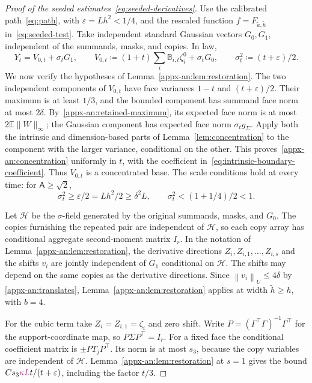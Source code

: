 \documentclass[11pt,letterpaper]{article}
\newcommand{\vSix}[1]{{\color{magenta}#1}}
\theoremstyle{remark}
\newcommand{\E}{\mathbb E}
\newcommand{\norm}[1]{\left\lVert#1\right\rVert}
\begin{document}
\begin{proof}[Proof of the seeded estimates~\eqref{eq:seeded-derivatives}]
Use the calibrated path~\eqref{eq:path}, with
\(\varepsilon=Lh^2<1/4\), and the rescaled function
\(f=F_{\widetilde a,\widetilde h}\) in~\eqref{eq:seeded-test}.
Take independent standard Gaussian vectors \(G_0,G_1\), independent
of the summands, masks, and copies. In law,
\begin{equation}
 Y_t=V_{0,t}+\sigma_tG_1,\qquad
 V_{0,t}\coloneqq(1+t)\sum_i\mathbb B_{i,t}\zeta_i^0+\sigma_tG_0,
 \qquad\sigma_t^2\coloneqq(t+\varepsilon)/2.
 \label{eq:seeded-gaussian-split}
\end{equation}
{We now verify the hypotheses of Lemma~\ref{appx-an:lem:restoration}.}
The two independent components of \(V_{0,t}\) have face variances
\(1-t\) and \((t+\varepsilon)/2\). Their maximum is at least
\(1/3\), and the bounded component has summand face norm at most
\vSix{\(2\delta\). By~\eqref{appx-an:retained-maximum}, its expected
face norm is at most \(2\E\|W\|_\infty\); the Gaussian component
has expected face norm \(\sigma_tg_\Sigma\). Apply both the intrinsic
and dimension-based parts of Lemma~\ref{lem:concentration} to the
component with the larger variance, conditional on the other. This
proves~\eqref{appx-an:concentration} uniformly in \(t\), with the
coefficient in~\eqref{eq:intrinsic-boundary-coefficient}.}
Thus \(V_{0,t}\) is a concentrated base. The scale conditions hold
at every time: for \(\mathsf A\ge\sqrt2\),
\[
 \sigma_t^2\ge\varepsilon/2=Lh^2/2\ge\delta^2L,
 \qquad \sigma_t^2<(1+1/4)/2<1.
\]

Let \(\mathcal H\) be the {\(\sigma\)-field} generated by the original
summands, masks, and \(G_0\). The copies furnishing the repeated
pair are independent of \(\mathcal H\), so each copy array has
conditional aggregate second-moment matrix \(I_r\). {In the notation
of Lemma~\ref{appx-an:lem:restoration}, the derivative directions
\(Z_i,Z_{i,1},\ldots,Z_{i,s}\) and the shifts \(v_i\) are jointly
independent of \(G_1\) conditional on \(\mathcal H\).
The shifts may depend on the same copies as the derivative directions.
Since \(\norm{v_i}_U\le4\delta\) by \eqref{appx-an:translates},
Lemma~\ref{appx-an:lem:restoration} applies at width
\(\widetilde h\ge h\), with \(b=4\).}

For the cubic term take $Z_i=Z_{i,1}=\zeta_i$ and zero shift. Write $P=(\Gamma^\top\Gamma)^{-1}\Gamma^\top$ for the support-coordinate map, so $P\Sigma P^\top=I_r$. For a fixed face the conditional coefficient matrix is $\pm P T_j P^\top$. Its norm is at most $s_3$, because the copy variables are independent of $\mathcal H$. Lemma~\ref{appx-an:lem:restoration} at $s=1$ gives the bound $C s_3 \vSix{\kappa L}t/(t+\varepsilon)$, including the factor $t/3$.


\end{proof}
\end{document}
